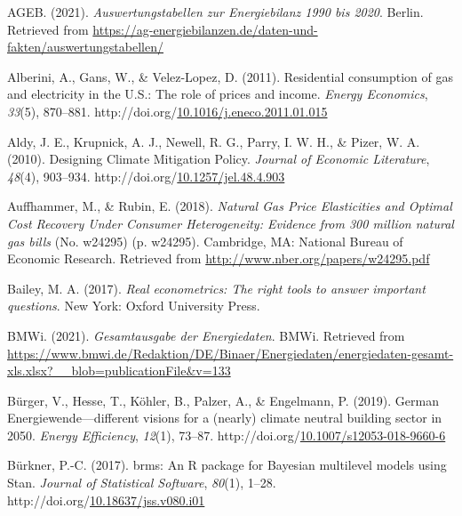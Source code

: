 \documentclass[12pt,twoside]{reedthesis}
\newlength{\cslhangindent}
\newenvironment{CSLReferences}[2] %
 {%
  \setlength{\parindent}{0pt}
  \ifodd #1 \everypar{\setlength{\hangindent}{\cslhangindent}}\ignorespaces\fi
  \ifnum #2 > 0
  \setlength{\parskip}{#2\baselineskip}
  \fi
 }%
 {}
\begin{document}
\hypertarget{refs}{}
\begin{CSLReferences}{1}{0}
\leavevmode{}%
AGEB. (2021). \emph{Auswertungstabellen zur Energiebilanz 1990 bis 2020}. Berlin. Retrieved from \url{https://ag-energiebilanzen.de/daten-und-fakten/auswertungstabellen/}

\leavevmode{}%
Alberini, A., Gans, W., \& Velez-Lopez, D. (2011). Residential consumption of gas and electricity in the U.S.: The role of prices and income. \emph{Energy Economics}, \emph{33}(5), 870--881. http://doi.org/\href{https://doi.org/10.1016/j.eneco.2011.01.015}{10.1016/j.eneco.2011.01.015}

\leavevmode{}%
Aldy, J. E., Krupnick, A. J., Newell, R. G., Parry, I. W. H., \& Pizer, W. A. (2010). Designing Climate Mitigation Policy. \emph{Journal of Economic Literature}, \emph{48}(4), 903--934. http://doi.org/\href{https://doi.org/10.1257/jel.48.4.903}{10.1257/jel.48.4.903}

\leavevmode{}%
Auffhammer, M., \& Rubin, E. (2018). \emph{Natural Gas Price Elasticities and Optimal Cost Recovery Under Consumer Heterogeneity: Evidence from 300 million natural gas bills} (No. w24295) (p. w24295). Cambridge, MA: National Bureau of Economic Research. Retrieved from \url{http://www.nber.org/papers/w24295.pdf}

\leavevmode{}%
Bailey, M. A. (2017). \emph{Real econometrics: The right tools to answer important questions}. New York: Oxford University Press.

\leavevmode{}%
BMWi. (2021). \emph{Gesamtausgabe der Energiedaten}. BMWi. Retrieved from \url{https://www.bmwi.de/Redaktion/DE/Binaer/Energiedaten/energiedaten-gesamt-xls.xlsx?__blob=publicationFile\&v=133}

\leavevmode{}%
Bürger, V., Hesse, T., Köhler, B., Palzer, A., \& Engelmann, P. (2019). German Energiewende---different visions for a (nearly) climate neutral building sector in 2050. \emph{Energy Efficiency}, \emph{12}(1), 73--87. http://doi.org/\href{https://doi.org/10.1007/s12053-018-9660-6}{10.1007/s12053-018-9660-6}

\leavevmode{}%
Bürkner, P.-C. (2017). brms: An R package for Bayesian multilevel models using Stan. \emph{Journal of Statistical Software}, \emph{80}(1), 1--28. http://doi.org/\href{https://doi.org/10.18637/jss.v080.i01}{10.18637/jss.v080.i01}


\end{CSLReferences}
\end{document}

